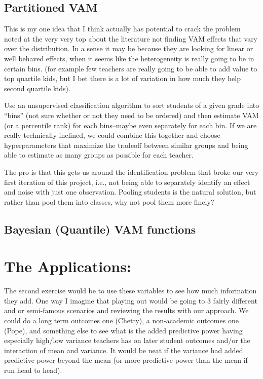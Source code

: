 \documentclass[letterpaper,12pt]{article}
\begin{document}
\subsection{Partitioned VAM}

This is my one idea that I think actually has potential to crack the problem noted at the very very top about the literature not finding VAM effects that vary over the distribution. In a sense it may be because they are looking for linear or well behaved effects, when it seems like the heterogeneity is really going to be in certain bins. (for example few teachers are really going to be able to add value to top quartile kids, but I bet there is a lot of variation in how much they help second quartile kids).

Use an unsupervised classification algorithm to sort students of a given grade into “bins” (not sure whether or not they need to be ordered) and then estimate VAM (or a percentile rank) for each bins--maybe even separately for each bin. If we are really technically inclined, we could combine this together and choose hyperparameters that maximize the tradeoff between similar groups and being able to estimate as many groups as possible for each teacher.

The pro is that this gets us around the identification problem that broke our very first iteration of this project, i.e., not being able to separately identify an effect and noise with just one observation. Pooling students is the natural solution, but rather than pool them into classes, why not pool them more finely?


\subsection{Bayesian (Quantile) VAM functions}



\section{The Applications:}



The second exercise would be to use these variables to see how much information they add. One way I imagine that playing out would be going to 3 fairly different and or semi-famous scenarios and reviewing the results with our approach. We could do a long term outcomes one (Chetty), a non-academic outcomes one (Pope), and something else to see what is the added predictive power having especially high/low variance teachers has on later student outcomes and/or the interaction of mean and variance. It would be neat if the variance had added predictive power beyond the mean (or more predictive power than the mean if run head to head).
















\end{document}
